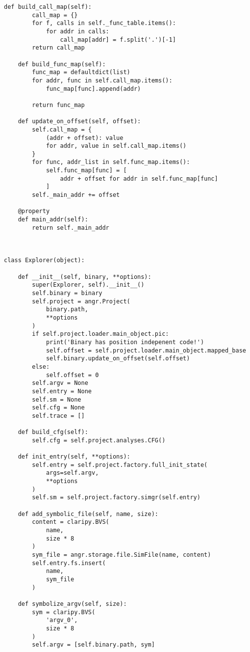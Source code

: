 \begin{lstlisting}[environoment=py_code, caption=taint\_influence.py, captionpos=b]
    def build_call_map(self):
        call_map = {}
        for f, calls in self._func_table.items():
            for addr in calls:
                call_map[addr] = f.split('.')[-1]
        return call_map

    def build_func_map(self):
        func_map = defaultdict(list)
        for addr, func in self.call_map.items():
            func_map[func].append(addr)

        return func_map

    def update_on_offset(self, offset):
        self.call_map = {
            (addr + offset): value
            for addr, value in self.call_map.items()
        }
        for func, addr_list in self.func_map.items():
            self.func_map[func] = [
                addr + offset for addr in self.func_map[func]
            ]
        self._main_addr += offset

    @property
    def main_addr(self):
        return self._main_addr



class Explorer(object):

    def __init__(self, binary, **options):
        super(Explorer, self).__init__()
        self.binary = binary
        self.project = angr.Project(
            binary.path,
            **options
        )
        if self.project.loader.main_object.pic:
            print('Binary has position indepenent code!')
            self.offset = self.project.loader.main_object.mapped_base
            self.binary.update_on_offset(self.offset)
        else:
            self.offset = 0
        self.argv = None
        self.entry = None
        self.sm = None
        self.cfg = None
        self.trace = []

    def build_cfg(self):
        self.cfg = self.project.analyses.CFG()

    def init_entry(self, **options):
        self.entry = self.project.factory.full_init_state(
            args=self.argv,
            **options
        )
        self.sm = self.project.factory.simgr(self.entry)

    def add_symbolic_file(self, name, size):
        content = claripy.BVS(
            name,
            size * 8
        )
        sym_file = angr.storage.file.SimFile(name, content)
        self.entry.fs.insert(
            name,
            sym_file
        )

    def symbolize_argv(self, size):
        sym = claripy.BVS(
            'argv_0',
            size * 8
        )
        self.argv = [self.binary.path, sym]


\end{lstlisting}

